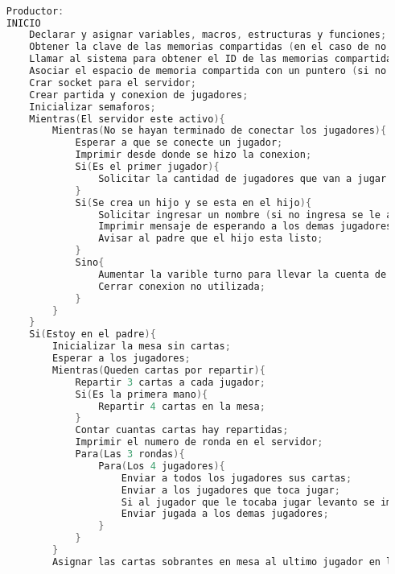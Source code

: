 \begin{lstlisting}[language=C]          % No usar tildes en el pseudocódigo y dejar una linea vacía al principio y al final

    Productor:
    INICIO
        Declarar y asignar variables, macros, estructuras y funciones;
        Obtener la clave de las memorias compartidas (en el caso de no obtenerlas imprimir error);
        Llamar al sistema para obtener el ID de las memorias compartidas (en el caso de que no obtenerlas imprimir error);
        Asociar el espacio de memoria compartida con un puntero (si no puede asociar imprimir error);
        Crar socket para el servidor;
        Crear partida y conexion de jugadores;
        Inicializar semaforos;
        Mientras(El servidor este activo){
            Mientras(No se hayan terminado de conectar los jugadores){
                Esperar a que se conecte un jugador;
                Imprimir desde donde se hizo la conexion;
                Si(Es el primer jugador){
                    Solicitar la cantidad de jugadores que van a jugar (si no se ingresa un numero entre 2 y 4 volver a solicitar);
                }
                Si(Se crea un hijo y se esta en el hijo){
                    Solicitar ingresar un nombre (si no ingresa se le asigna un nombre por defecto);
                    Imprimir mensaje de esperando a los demas jugadores;
                    Avisar al padre que el hijo esta listo;
                }
                Sino{
                    Aumentar la varible turno para llevar la cuenta de clientes conectados;
                    Cerrar conexion no utilizada;
                }
            }
        }
        Si(Estoy en el padre){
            Inicializar la mesa sin cartas;
            Esperar a los jugadores;
            Mientras(Queden cartas por repartir){
                Repartir 3 cartas a cada jugador;
                Si(Es la primera mano){
                    Repartir 4 cartas en la mesa;
                }
                Contar cuantas cartas hay repartidas;
                Imprimir el numero de ronda en el servidor;
                Para(Las 3 rondas){
                    Para(Los 4 jugadores){
                        Enviar a todos los jugadores sus cartas;
                        Enviar a los jugadores que toca jugar;
                        Si al jugador que le tocaba jugar levanto se imprime que fue el ultimo en levantar;
                        Enviar jugada a los demas jugadores;
                    }
                }
            }
            Asignar las cartas sobrantes en mesa al ultimo jugador en levantar;

\end{lstlisting}
